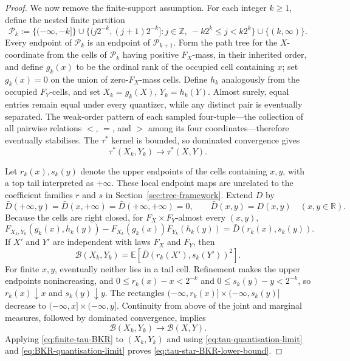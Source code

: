 \documentclass[pdflatex,sn-mathphys-num]{sn-jnl}
\theoremstyle{thmstyleone}
\begin{document}
\begin{proof}
We now remove the finite-support assumption.  For each integer $k\ge1$, define
the nested finite partition
\[
\mathcal P_k:=\{(-\infty,-k]\}
\cup\{(j2^{-k},(j+1)2^{-k}]:j\in\mathbb Z,\ -k2^k\le j<k2^k\}
\cup\{(k,\infty)\}.
\]
Every endpoint of $\mathcal P_k$ is an endpoint of
$\mathcal P_{k+1}$.  Form the path tree for the $X$-coordinate from the cells
of $\mathcal P_k$
having positive $F_X$-mass, in their inherited order, and define $g_k(x)$
to be the ordinal rank of the occupied cell containing $x$; set $g_k(x)=0$
on the union of zero-$F_X$-mass cells.  Define $h_k$ analogously
from the occupied $F_Y$-cells, and set $X_k=g_k(X)$, $Y_k=h_k(Y)$.  Almost
surely, equal entries remain equal under every quantizer, while any distinct
pair is eventually separated.  The weak-order pattern of each sampled
four-tuple---the collection of all pairwise relations $<$, $=$, and $>$ among
its four coordinates---therefore eventually stabilises.
The $\tau^*$ kernel is bounded, so dominated convergence gives
\begin{equation}\label{eq:tau-quantisation-limit}
\tau^*(X_k,Y_k)\longrightarrow\tau^*(X,Y).
\end{equation}

Let $r_k(x),s_k(y)$ denote the upper endpoints of the cells containing
$x,y$, with a top tail interpreted as $+\infty$.  These local endpoint maps
are unrelated to the coefficient families $r$ and $s$ in
Section~\ref{sec:tree-framework}.  Extend
$D$ by
\[
\bar D(+\infty,y)=\bar D(x,+\infty)=\bar D(+\infty,+\infty)=0,
\qquad
\bar D(x,y)=D(x,y)\quad(x,y\in\mathbb R).
\]
Because the cells are right closed, for $F_X\times F_Y$-almost every
$(x,y)$,
\[
F_{X_k,Y_k}(g_k(x),h_k(y))-F_{X_k}(g_k(x))F_{Y_k}(h_k(y))
=\bar D(r_k(x),s_k(y)).
\]
If $X'$ and $Y'$ are independent with laws $F_X$ and $F_Y$, then
\[
\mathcal B(X_k,Y_k)
=\mathbb E\!\left[\bar D(r_k(X'),s_k(Y'))^2\right].
\]
For finite $x,y$, eventually neither lies in a tail cell.  Refinement
makes the upper endpoints nonincreasing, and
$0\le r_k(x)-x<2^{-k}$ and $0\le s_k(y)-y<2^{-k}$,
so $r_k(x)\downarrow x$ and $s_k(y)\downarrow y$.  The rectangles
$(-\infty,r_k(x)]\times(-\infty,s_k(y)]$ decrease to
$(-\infty,x]\times(-\infty,y]$.  Continuity from above of the joint and
marginal measures, followed by dominated convergence, implies
\begin{equation}\label{eq:BKR-quantisation-limit}
\mathcal B(X_k,Y_k)\longrightarrow\mathcal B(X,Y).
\end{equation}
Applying \eqref{eq:finite-tau-BKR} to $(X_k,Y_k)$ and using
\eqref{eq:tau-quantisation-limit} and
\eqref{eq:BKR-quantisation-limit} proves
\eqref{eq:tau-star-BKR-lower-bound}.


\end{proof}
\end{document}

